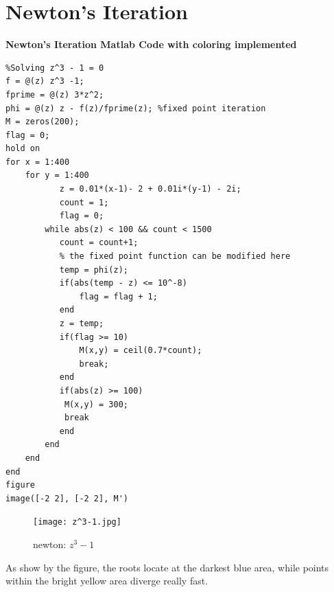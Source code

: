 \documentclass{article}
\begin{document}
\section{Newton's Iteration}
\textbf{Newton's Iteration Matlab Code with coloring implemented}
\begin{lstlisting}
%Solving z^3 - 1 = 0
f = @(z) z^3 -1;                    
fprime = @(z) 3*z^2;
phi = @(z) z - f(z)/fprime(z); %fixed point iteration
M = zeros(200);
flag = 0;
hold on
for x = 1:400
    for y = 1:400
           z = 0.01*(x-1)- 2 + 0.01i*(y-1) - 2i;
           count = 1;
           flag = 0;
        while abs(z) < 100 && count < 1500
           count = count+1;
           % the fixed point function can be modified here
           temp = phi(z);
           if(abs(temp - z) <= 10^-8)
               flag = flag + 1;
           end
           z = temp;
           if(flag >= 10)
               M(x,y) = ceil(0.7*count);
               break;
           end
           if(abs(z) >= 100)
            M(x,y) = 300;
            break
           end
        end
    end
end
figure
image([-2 2], [-2 2], M')
\end{lstlisting}
\begin{figure}[H]
    \centering
    \texttt{[image: z^3-1.jpg]}
    \caption{newton: $z^3-1$}
\end{figure}
    As show by the figure, the roots locate at the darkest blue area, while points within the bright yellow area diverge really fast.
\end{document}
